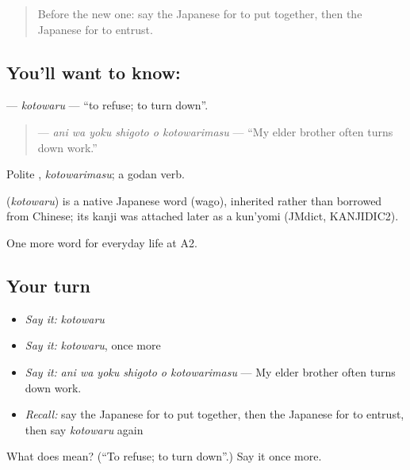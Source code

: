 \begin{quote}
Before the new one: say the Japanese for to put together, then the Japanese for to entrust.
\end{quote}

\subsection*{You'll want to know: }
\textbf{} — \emph{kotowaru} — \textquotedblleft{}to refuse; to turn down\textquotedblright{}.

\begin{quote}
\textbf{   } — \emph{ani wa yoku shigoto o kotowarimasu} — \textquotedblleft{}My elder brother often turns down work.\textquotedblright{}
\end{quote}

Polite \textbf{}, \emph{kotowarimasu}; a godan verb.

\begin{cousinweb}
\textbf{} (\emph{kotowaru}) is a native Japanese word (wago), inherited rather than borrowed from Chinese; its kanji was attached later as a kun'yomi (JMdict, KANJIDIC2).
\end{cousinweb}

\begin{grammarlens}[title={What you've built}]
One more word for everyday life at A2.
\end{grammarlens}

\subsection*{Your turn}
\begin{itemize}
\raggedright
  \item \emph{Say it:} \emph{kotowaru}
  \item \emph{Say it:} \emph{kotowaru}, once more
  \item \emph{Say it:} \emph{ani wa yoku shigoto o kotowarimasu} — My elder brother often turns down work.
  \item \emph{Recall:} say the Japanese for to put together, then the Japanese for to entrust, then say \emph{kotowaru} again
\end{itemize}

\begin{tcolorbox}[breakable,colback=teal!4,colframe=teal!35!black,title={Before you move on}]
What does  mean? (\textquotedblleft{}To refuse; to turn down\textquotedblright{}.) Say it once more.
\end{tcolorbox}
